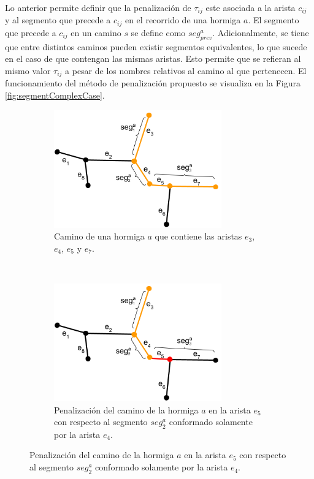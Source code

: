 Lo anterior permite definir que la penalizaci\'on de $\tau_{ij}$ este asociada a la arista $c_{ij}$ y al segmento que precede a $c_{ij}$ en el recorrido de una hormiga $a$. El segmento que precede a $c_{ij}$ en un camino $s$ se define como $seg^{a}_{prev}$. Adicionalmente, se tiene que entre distintos caminos pueden existir segmentos equivalentes, lo que sucede en el caso de que contengan las mismas aristas. Esto permite que se refieran al mismo valor $\tau_{ij}$ a pesar de los nombres relativos al camino al que pertenecen. El funcionamiento del m\'etodo de penalizaci\'on propuesto se visualiza en la Figura \ref{fig:segmentComplexCase}.
 \begin{figure}[t!]
    \centering
    \begin{subfigure}[t]{0.48\textwidth}
        \centering
        \includegraphics[height=2in]{imagenes/ant_segments_complex_case_1.png}
        \caption{Camino de una hormiga $a$ que contiene las aristas $e_3$, $e_4$, $e_5$ y $e_7$.}
        \label{fig:segmentComplexCase1}
    \end{subfigure}%
    ~ \hspace{0.5cm}
    \begin{subfigure}[t]{0.48\textwidth}
        \centering
        \includegraphics[height=2in]{imagenes/ant_segments_complex_case_2.png}
        \caption{Penalizaci\'on del camino de la hormiga $a$ en la arista $e_5$ con respecto al segmento $seg^{a}_2$ conformado solamente por la arista $e_4$.}
        \label{fig:segmentComplexCase2}
    \end{subfigure}


\end{figure}

